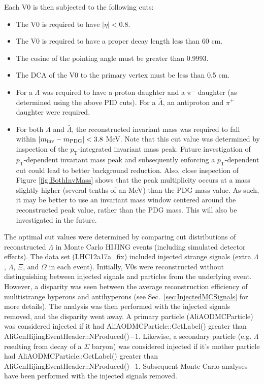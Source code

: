 Each V0 is then subjected to the following cuts:
\begin{itemize}
\item The V0 is required to have $|\eta| < 0.8$.
\item The V0 is required to have a proper decay length less than 60 cm.
\item The cosine of the pointing angle must be greater than 0.9993.
\item The DCA of the V0 to the primary vertex must be less than 0.5 cm.
\item For a $\Lambda$ was required to have a proton daughter and a $\pi^-$ daughter (as determined using the above PID cuts).  
For a $\bar{\Lambda}$, an antiproton and $\pi^+$ daughter were required.
\item For both $\Lambda$ and $\bar{\Lambda}$, the reconstructed invariant mass was required to fall within $\left\lvert m_\mathrm{inv}-m_\mathrm{PDG}\right\rvert < 3.8$ MeV.  
Note that this cut value was determined by inspection of the $p_\mathrm{T}$-integrated invariant mass peak.  
Future investigation of $p_\mathrm{T}$-dependent invariant mass peak and subsequently enforcing a $p_\mathrm{T}$-dependent cut could lead to better background reduction.  
Also, close inspection of Figure \ref{fig:BothInvMass} shows that the peak multiplicity occurs at a mass slightly higher (several tenths of an MeV) than the PDG mass value.  
As such, it may be better to use an invariant mass window centered around the reconstructed peak value, rather than the PDG mass.  
This will also be investigated in the future.
\end{itemize}

The optimal cut values were determined by comparing cut distributions of reconstructed $\Lambda$ in Monte Carlo HIJING events (including simulated detector effects).  
The data set (LHC12a17a\_fix) included injected strange signals (extra $\Lambda$, $\bar{\Lambda}$, $\Xi$, and $\Omega$ in each event).  
Initially, V0s were reconstructed without distinguishing between injected signals and particles from the underlying event.  
However, a disparity was seen between the average reconstruction efficiency of mulitistrange hyperons and antihyperons (see Sec.\ \ref{sec:InjectedMCSignals} for more details).  
The analysis was then performed with the injected signals removed, and the disparity went away.  A primary particle (AliAODMCParticle) was considered injected if it had AliAODMCParticle::GetLabel() greater than AliGenHijingEventHeader::NProduced()$-1$. 
Likewise, a secondary particle (e.g. $\Lambda$ resulting from decay of a $\Sigma$ baryon) was considered injected if it's mother particle had AliAODMCParticle::GetLabel() greater than AliGenHijingEventHeader::NProduced()$-1$.  
Subsequent Monte Carlo analyses have been performed with the injected signals removed.

